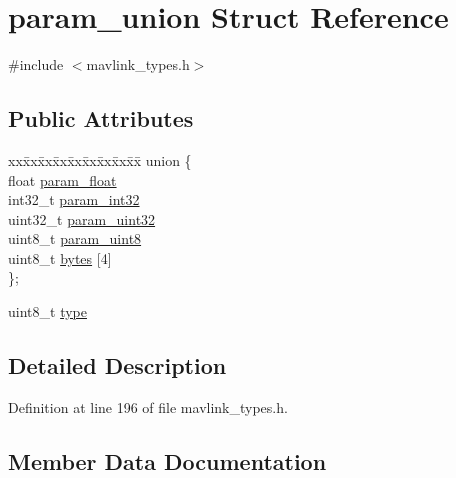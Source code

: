 \hypertarget{structparam__union}{}\section{param\+\_\+union Struct Reference}
\label{structparam__union}


{\ttfamily \#include $<$mavlink\+\_\+types.\+h$>$}

\subsection*{Public Attributes}
\begin{DoxyCompactItemize}
\item 
\begin{tabbing}
xx\=xx\=xx\=xx\=xx\=xx\=xx\=xx\=xx\=\kill
union \{\\
\>float \mbox{\hyperlink{structparam__union_afcfa880ccb1ace3c6a26e2bf008563aa}{param\_float}}\\
\>int32\_t \mbox{\hyperlink{structparam__union_a30808fc70851f9723566285dce61a336}{param\_int32}}\\
\>uint32\_t \mbox{\hyperlink{structparam__union_a67c8edafdce53186bd16154cdbe1d736}{param\_uint32}}\\
\>uint8\_t \mbox{\hyperlink{structparam__union_ad3e573e92099cb9f0cfabf556a6c99a7}{param\_uint8}}\\
\>uint8\_t \mbox{\hyperlink{structparam__union_a2a806761f2869448bb842d1dc78e1c74}{bytes}} \mbox{[}4\mbox{]}\\
\}; \\

\end{tabbing}\item 
uint8\+\_\+t \mbox{\hyperlink{structparam__union_a931bfe7edb069e632613635165968af6}{type}}
\end{DoxyCompactItemize}


\subsection{Detailed Description}


Definition at line 196 of file mavlink\+\_\+types.\+h.



\subsection{Member Data Documentation}
\mbox{\label{structparam__union_a98482da8cbf7aff8f82c5f8408312b20}} 
